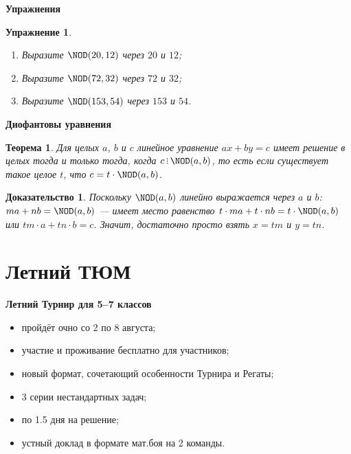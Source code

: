 \documentclass[aspectratio=1610,11pt]{beamer}
\newtheorem{Th}{Теорема}
\newtheorem{Prof}{Доказательство}
\newtheorem{Exer}{Упражнение}
\newcommand\fram[2]{\begin{frame}{\bf #1} #2 \end{frame}}
\def\divsby{\mathop{\rlap{.}\rlap{\raisebox{0.55ex}{.}}\raisebox{1.1ex}{.}}}
\begin{document}
\fram{Упражнения}{
\Large
\begin{Exer}
\begin{enumerate}
\item Выразите $\NOD(20, 12)$ через $20$ и $12$;
\item Выразите $\NOD(72, 32)$ через $72$ и $32$;
\item Выразите $\NOD(153, 54)$ через $153$ и $54$.
\end{enumerate}
\end{Exer}
}

\fram{Диофантовы уравнения}{
\Large
\begin{Th}
Для целых $a$, $b$ и $c$ линейное уравнение $ax+by = c$ имеет решение в целых тогда и только тогда, когда $c \divsby \NOD(a, b)$, то есть если существует такое целое $t$, что $c = t\cdot\NOD(a,b)$.
\end{Th}
\begin{Prof}
Поскольку $\NOD(a,b)$ линейно выражается через $a$ и $b$: $ma+nb=\NOD(a,b)$ --- имеет место равенство $t\cdot ma+t\cdot nb=t\cdot\NOD(a,b)$ или $tm\cdot a + tn\cdot b = c$. Значит, достаточно просто взять $x = tm$ и $y = tn$.
\end{Prof}
}





\section{Летний ТЮМ}
\fram{Летний Турнир для 5--7 классов}{
\Large
\begin{itemize}
	\item пройдёт очно со 2 по 8 августа;
	\item участие и проживание бесплатно для участников;
	\item новый формат, сочетающий особенности Турнира и Регаты;
	\item 3 серии нестандартных задач;
	\item по 1.5 дня на решение;
	\item устный доклад в формате мат.боя на 2 команды.
\end{itemize}
}
\end{document}

